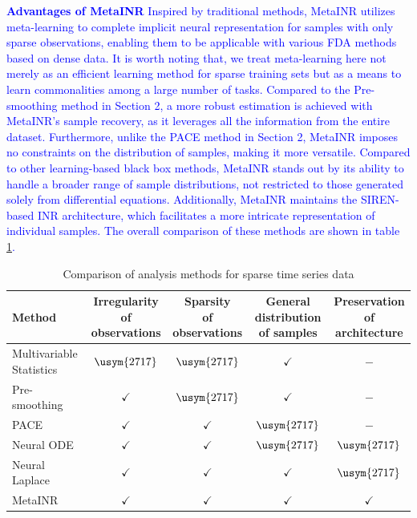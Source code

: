 \documentclass{article}
\newcommand{\xmark}{\usym{2717}}
\begin{document}
\textcolor{blue}{
\textbf{Advantages of MetaINR}
Inspired by traditional methods, MetaINR utilizes meta-learning to complete implicit neural representation for samples with only sparse observations, 
enabling them to be applicable with various FDA methods based on dense data.
It is worth noting that, we treat meta-learning here not merely as an efficient learning method for sparse training sets but as a means to learn commonalities among a large number of tasks.
Compared to the Pre-smoothing method in Section 2, a more robust estimation is achieved with MetaINR's sample recovery, as it leverages all the information from the entire dataset. 
Furthermore, unlike the PACE method in Section 2, 
MetaINR imposes no constraints on the distribution of samples, making it more versatile.
Compared to other learning-based black box methods, MetaINR stands out by its ability to handle a broader range of sample distributions, not restricted to those generated solely from differential equations.
Additionally, MetaINR maintains the SIREN-based INR architecture, which facilitates a more intricate representation of individual samples.
The overall comparison of these methods are shown in table \ref{method_compare}.
}

\begin{table}[htb]
  \centering
\begin{tabular}{lcccc}
  \hline 
  Method & \thead{Irregularity\\of observations} & \thead{Sparsity \\of observations} & \thead{General distribution \\ of samples} & \thead{Preservation \\ of architecture} \\
  \hline  
  Multivariable Statistics& $\xmark$ & $\xmark$ & $\checkmark$ & $-$\\
  Pre-smoothing & $\checkmark$ & $\xmark$ & $\checkmark$ & $-$\\
  PACE \cite{yao2005functional} & $\checkmark$ & $\checkmark$ & $\xmark$& $-$  \\
  Neural ODE \cite{chen2018neural} & $\checkmark$ & $\checkmark$ & $\xmark$ & $\xmark$ \\
  Neural Laplace \cite{holt2022neural} & $\checkmark$ & $\checkmark$ & $\checkmark$ & $\xmark$ \\
  MetaINR & $\checkmark$ & $\checkmark$ &$\checkmark$ & $\checkmark$\\
 \hline
\end{tabular}
\caption{Comparison of analysis methods for sparse time series data}
\label{method_compare}
\end{table}
\end{document}
